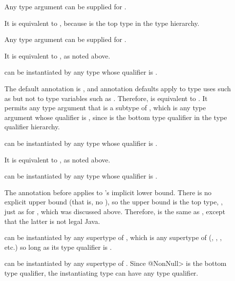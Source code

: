 \begin{description}
\item[]
  Any type argument can be supplied for .

  It is equivalent to , because
   is the top type in the type hierarchy.

\item[]
  Any type argument can be supplied for .

  It is equivalent to , as noted above.

\item[]
   can be instantiated by any type whose qualifier is .

  The default annotation is , and annotation defaults apply
  to type uses such as  but not to type variables such as
  .  Therefore,  is equivalent to
  .  It permits any type argument that is
  a subtype of , which is any type argument whose
  qualifier is , since  is the bottom type
  qualifier in the type qualifier hierarchy.

\item[]
   can be instantiated by any type whose qualifier is .

  It is equivalent to , as noted above.

\item[]
   can be instantiated by any type whose qualifier is .

  The annotation  before  applies to 's
  implicit lower bound.  There is no explicit upper bound (that is, no
  ), so the upper bound is the top type, , just as for , which was discussed above.  Therefore,
   is the same as , except that the latter is not legal Java.

\item[]
   can be instantiated by any supertype of ,
  which is any supertype of  (,
  , , etc.) so long as its type
  qualifier is .

\item[]
   can be instantiated by any supertype of .
  Since \<@NonNull> is the bottom type qualifier, the instantiating type
  can have any type qualifier.

\end{description}

